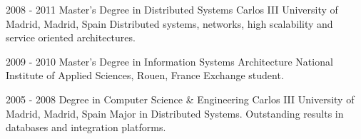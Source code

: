 
\begin{rlist}
  \item 
    \education
      {2008 - 2011}
      {Master's Degree in Distributed Systems}
      {Carlos III University of Madrid, Madrid, Spain}
      {Distributed systems, networks, high scalability and service oriented architectures.}
  \item 
    \education
      {2009 - 2010}
      {Master's Degree in Information Systems Architecture}
      {National Institute of Applied Sciences, Rouen, France}
      {Exchange student.} 
  \item 
    \education
      {2005 - 2008}
      {Degree in Computer Science \& Engineering}
      {Carlos III University of Madrid, Madrid, Spain}
      {Major in Distributed Systems. Outstanding results in databases and integration platforms.}
\end{rlist}

